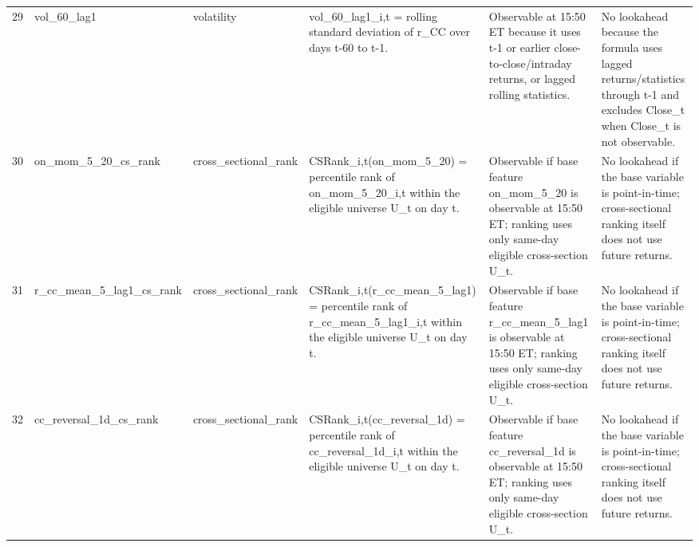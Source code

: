 \begin{landscape}
\begin{longtable}{P{0.42cm} P{2.25cm} P{2.05cm} P{5.25cm} P{4.85cm} P{5.25cm}}
29 & vol\_\allowbreak{}60\_\allowbreak{}lag1 & volatility & vol\_\allowbreak{}60\_\allowbreak{}lag1\_\allowbreak{}i,t = rolling standard deviation of r\_\allowbreak{}CC over days t-60 to t-1. & Observable at 15:50 ET because it uses t-1 or earlier close-to-close/intraday returns, or lagged rolling statistics. & No lookahead because the formula uses lagged returns/statistics through t-1 and excludes Close\_\allowbreak{}t when Close\_\allowbreak{}t is not observable. \\
30 & on\_\allowbreak{}mom\_\allowbreak{}5\_\allowbreak{}20\_\allowbreak{}cs\_\allowbreak{}rank & cross\_\allowbreak{}sectional\_\allowbreak{}rank & CSRank\_\allowbreak{}i,t(on\_\allowbreak{}mom\_\allowbreak{}5\_\allowbreak{}20) = percentile rank of on\_\allowbreak{}mom\_\allowbreak{}5\_\allowbreak{}20\_\allowbreak{}i,t within the eligible universe U\_\allowbreak{}t on day t. & Observable if base feature on\_\allowbreak{}mom\_\allowbreak{}5\_\allowbreak{}20 is observable at 15:50 ET; ranking uses only same-day eligible cross-section U\_\allowbreak{}t. & No lookahead if the base variable is point-in-time; cross-sectional ranking itself does not use future returns. \\
31 & r\_\allowbreak{}cc\_\allowbreak{}mean\_\allowbreak{}5\_\allowbreak{}lag1\_\allowbreak{}cs\_\allowbreak{}rank & cross\_\allowbreak{}sectional\_\allowbreak{}rank & CSRank\_\allowbreak{}i,t(r\_\allowbreak{}cc\_\allowbreak{}mean\_\allowbreak{}5\_\allowbreak{}lag1) = percentile rank of r\_\allowbreak{}cc\_\allowbreak{}mean\_\allowbreak{}5\_\allowbreak{}lag1\_\allowbreak{}i,t within the eligible universe U\_\allowbreak{}t on day t. & Observable if base feature r\_\allowbreak{}cc\_\allowbreak{}mean\_\allowbreak{}5\_\allowbreak{}lag1 is observable at 15:50 ET; ranking uses only same-day eligible cross-section U\_\allowbreak{}t. & No lookahead if the base variable is point-in-time; cross-sectional ranking itself does not use future returns. \\
32 & cc\_\allowbreak{}reversal\_\allowbreak{}1d\_\allowbreak{}cs\_\allowbreak{}rank & cross\_\allowbreak{}sectional\_\allowbreak{}rank & CSRank\_\allowbreak{}i,t(cc\_\allowbreak{}reversal\_\allowbreak{}1d) = percentile rank of cc\_\allowbreak{}reversal\_\allowbreak{}1d\_\allowbreak{}i,t within the eligible universe U\_\allowbreak{}t on day t. & Observable if base feature cc\_\allowbreak{}reversal\_\allowbreak{}1d is observable at 15:50 ET; ranking uses only same-day eligible cross-section U\_\allowbreak{}t. & No lookahead if the base variable is point-in-time; cross-sectional ranking itself does not use future returns. \\

\end{longtable}
\end{landscape}
